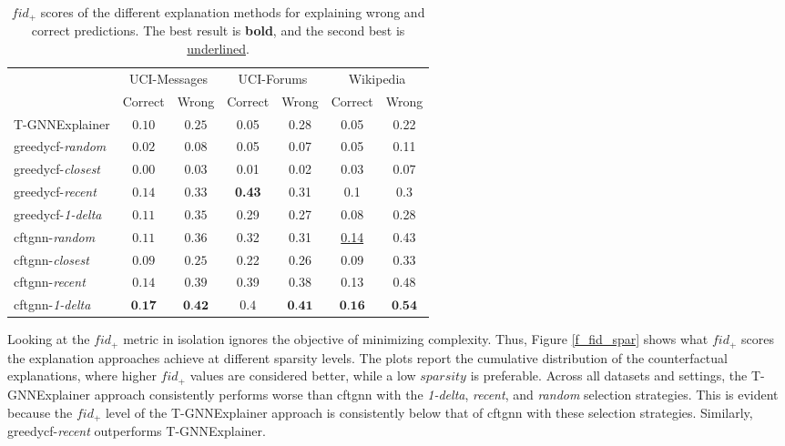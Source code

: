 \begin{table}
    \centering
    \small
    \begin{tabular}{lcccccc}
    \hline
         &  \multicolumn{2}{c}{UCI-Messages}&  \multicolumn{2}{c}{UCI-Forums}&  \multicolumn{2}{c}{Wikipedia}\\
         &  Correct&  Wrong&  Correct&  Wrong&  Correct& Wrong\\
         \hline
         T-GNNExplainer&  $0.10$&  $0.25$&  0.05&  0.28&  0.05& 0.22\\
         \gls{greedycf}-\textit{random}&  $0.02$&  $0.08$&  0.05&  0.07&  0.05& 0.11\\
         \gls{greedycf}-\textit{closest}&  $0.00$&  $0.03$&  0.01&  0.02&  0.03& 0.07\\
         \gls{greedycf}-\textit{recent}&  \underline{$0.14$}&  $0.33$&  \textbf{0.43}&  0.31&  0.1& 0.3\\
         \gls{greedycf}-\textit{1-delta}&  $0.11$&  $0.35$&  0.29&  0.27&  0.08& 0.28\\
         \gls{cftgnn}-\textit{random}&  $0.11$&  $0.36$&  0.32&  0.31&  \underline{0.14}& 0.43\\
         \gls{cftgnn}-\textit{closest}&  $0.09$&  $0.25$&  0.22&  0.26&  0.09& 0.33\\
         \gls{cftgnn}-\textit{recent}&  \underline{$0.14$}&  \underline{$0.39$}&  0.39&  \underline{$0.38$}&  0.13& \underline{$0.48$}\\
 \gls{cftgnn}-\textit{1-delta}& $\textbf{0.17}$& $\textbf{0.42}$& \underline{$0.4$}& $\textbf{0.41}$& $\textbf{0.16}$&$\textbf{0.54}$\\
 \hline
    \end{tabular}
    \caption{$fid_+$ scores of the different explanation methods for explaining wrong and correct predictions. The best result is \textbf{bold}, and the second best is \underline{underlined}.}
    \label{t_fid_plus}
\end{table}


Looking at the $fid_+$ metric in isolation ignores the objective of minimizing complexity. Thus, Figure \ref{f_fid_spar} shows what $fid_+$ scores the explanation approaches achieve at different sparsity levels. The plots report the cumulative distribution of the counterfactual explanations, where higher $fid_+$ values are considered better, while a low $sparsity$ is preferable. Across all datasets and settings, the T-GNNExplainer approach consistently performs worse than \gls{cftgnn} with the \textit{1-delta}, \textit{recent}, and \textit{random} selection strategies. This is evident because the $fid_+$ level of the T-GNNExplainer approach is consistently below that of \gls{cftgnn} with these selection strategies. Similarly, \gls{greedycf}-\textit{recent} outperforms T-GNNExplainer.

